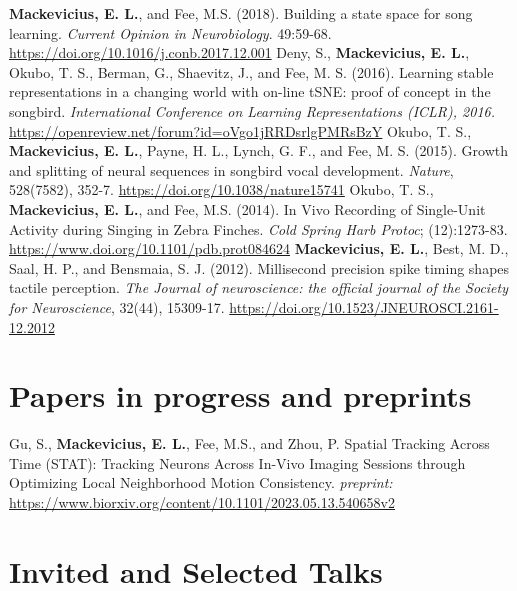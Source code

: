 \documentclass[11pt,a4paper]{moderncv}
\begin{document}
\newline
\textbf{Mackevicius, E. L.},  and  Fee, M.S. (2018). Building a state space for song learning. \textit{Current Opinion in Neurobiology}. 49:59-68. \url{https://doi.org/10.1016/j.conb.2017.12.001} 
\newline
\newline
Deny, S., \textbf{Mackevicius, E. L.}, Okubo, T. S., Berman, G., Shaevitz, J., and Fee, M. S. (2016). Learning stable representations in a changing world with on-line tSNE: proof of concept in the songbird. \textit{International Conference on Learning Representations (ICLR), 2016.} \url{https://openreview.net/forum?id=oVgo1jRRDsrlgPMRsBzY}
\newline
\newline
Okubo, T. S., \textbf{Mackevicius, E. L.}, Payne, H. L., Lynch, G. F.,  and  Fee, M. S. (2015). Growth and splitting of neural sequences in songbird vocal development. \textit{Nature}, 528(7582), 352-7. \url{https://doi.org/10.1038/nature15741}
\newline
\newline
 Okubo, T. S., \textbf{Mackevicius, E. L.},  and   Fee, M.S. (2014). In Vivo Recording of Single-Unit Activity during Singing in Zebra Finches. \textit{Cold Spring Harb Protoc}; (12):1273-83. \url{https://www.doi.org/10.1101/pdb.prot084624}
\newline
\newline
\textbf{Mackevicius, E. L.}, Best, M. D., Saal, H. P.,  and  Bensmaia, S. J. (2012). Millisecond precision spike timing shapes tactile perception. \textit{The Journal of neuroscience: the official journal of the Society for Neuroscience}, 32(44), 15309-17. \url{https://doi.org/10.1523/JNEUROSCI.2161-12.2012}

\section{Papers in progress and preprints}
Gu, S., \textbf{Mackevicius, E. L.}, Fee, M.S., and Zhou, P. Spatial Tracking Across Time (STAT): Tracking Neurons Across In-Vivo Imaging Sessions through Optimizing Local Neighborhood Motion Consistency. \emph{preprint:}
\url{https://www.biorxiv.org/content/10.1101/2023.05.13.540658v2}


\section{Invited and Selected Talks}
\end{document}
